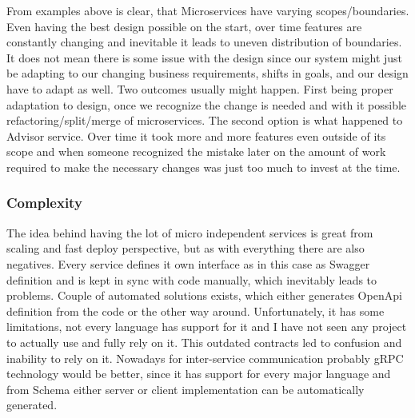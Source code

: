 From examples above is clear, that Microservices have varying scopes/boundaries. Even having the best design possible on the start, over time features are constantly changing and inevitable it leads to uneven distribution of boundaries. It does not mean there is some issue with the design since our system might just be adapting to our changing business requirements, shifts in goals, and our design have to adapt as well. Two outcomes usually might happen. First being proper adaptation to design, once we recognize the change is needed and with it possible refactoring/split/merge of microservices. The second option is what happened to Advisor service. Over time it took more and more features even outside of its scope and when someone recognized the mistake later on the amount of work required to make the necessary changes was just too much to invest at the time.

\subsubsection{Complexity}
The idea behind having the lot of micro independent services is great from scaling and fast deploy perspective, but as with everything there are also negatives. Every service defines it own interface as in this case as Swagger definition and is kept in sync with code manually, which inevitably leads to problems. Couple of automated solutions exists, which either generates OpenApi definition from the code or the other way around. Unfortunately, it has some limitations, not every language has support for it and I have not seen any project to actually use and fully rely on it. This outdated contracts led to confusion and inability to rely on it. Nowadays for inter-service communication probably gRPC technology would be better, since it has support for every major language and from Schema either server or client implementation can be automatically generated.

